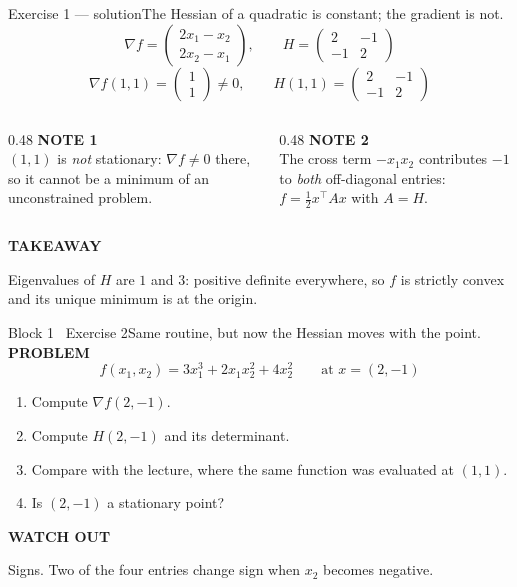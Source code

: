 \documentclass[aspectratio=169,11pt]{beamer}
\newcommand{\kicker}[1]{{\color{hseaccent}\scriptsize\bfseries\MakeUppercase{#1}}}
\newcommand{\takeaway}[2]{%
  \par\smallskip\noindent
  \colorbox{hselight}{\parbox{\dimexpr\textwidth-2\fboxsep}{%
    \kicker{#1}\par\vspace{0.12em}\footnotesize #2}}\par}
\begin{document}
\begin{frame}{Exercise 1 --- solution}{The Hessian of a quadratic is constant; the gradient is not.}
  \vspace{0.3em}
  \[ \nabla f=\begin{pmatrix}2x_1-x_2\\ 2x_2-x_1\end{pmatrix},
    \qquad
    H=\begin{pmatrix}2&-1\\-1&2\end{pmatrix} \]
  \vspace{-0.3em}
  \[ \nabla f(1,1)=\begin{pmatrix}1\\1\end{pmatrix}\neq 0,
    \qquad H(1,1)=\begin{pmatrix}2&-1\\-1&2\end{pmatrix} \]
  \begin{columns}[T,onlytextwidth]
    \begin{column}{0.48\textwidth}
      \kicker{note 1}\\[0.2em]
      {\small $(1,1)$ is \emph{not} stationary: $\nabla f\neq 0$ there, so it cannot be a minimum
        of an unconstrained problem.}
    \end{column}
    \begin{column}{0.48\textwidth}
      \kicker{note 2}\\[0.2em]
      {\small The cross term $-x_1x_2$ contributes $-1$ to \emph{both} off-diagonal entries:
        $f=\tfrac12x^\top Ax$ with $A=H$.}
    \end{column}
  \end{columns}
  \vspace{0.6em}
  \takeaway{takeaway}{Eigenvalues of $H$ are $1$ and $3$: positive definite everywhere, so $f$ is strictly convex
    and its unique minimum is at the origin.}
\end{frame}

\begin{frame}{Block 1 \textperiodcentered\ Exercise 2}{Same routine, but now the Hessian moves with the point.}
  \vspace{0.6em}
  \kicker{problem}
  \[ f(x_1,x_2)=3x_1^{3}+2x_1x_2^{2}+4x_2^{2}\qquad\text{at } x=(2,-1) \]
  \vspace{-0.5em}
  \begin{enumerate}\small
    \item Compute $\nabla f(2,-1)$.
    \item Compute $H(2,-1)$ and its determinant.
    \item Compare with the lecture, where the same function was evaluated at $(1,1)$.
    \item Is $(2,-1)$ a stationary point?
  \end{enumerate}
  \vspace{0.5em}
  \takeaway{watch out}{Signs. Two of the four entries change sign when $x_2$ becomes negative.}
\end{frame}
\end{document}
